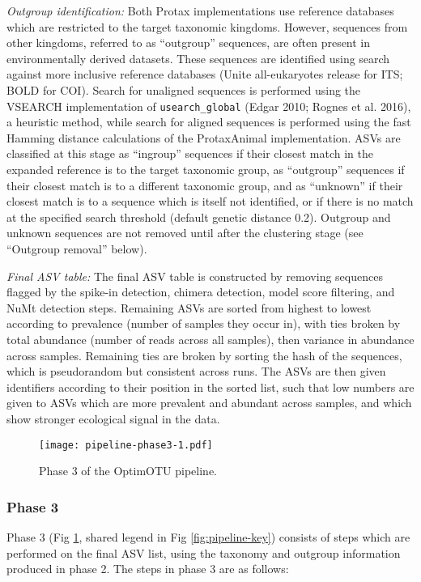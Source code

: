 \documentclass[
]{article}
\begin{document}
\emph{Outgroup identification:}
Both Protax implementations use reference databases which are restricted to the target taxonomic kingdoms.
However, sequences from other kingdoms, referred to as ``outgroup'' sequences, are often present in environmentally derived datasets.
These sequences are identified using search against more inclusive reference databases (Unite all-eukaryotes release for ITS; BOLD for COI).
Search for unaligned sequences is performed using the VSEARCH implementation of \texttt{usearch\_global} (Edgar 2010; Rognes et al. 2016), a heuristic method, while search for aligned sequences is performed using the fast Hamming distance calculations of the ProtaxAnimal implementation.
ASVs are classified at this stage as ``ingroup'' sequences if their closest match in the expanded reference is to the target taxonomic group, as ``outgroup'' sequences if their closest match is to a different taxonomic group, and as ``unknown'' if their closest match is to a sequence which is itself not identified, or if there is no match at the specified search threshold (default genetic distance 0.2).
Outgroup and unknown sequences are not removed until after the clustering stage (see ``Outgroup removal'' below).

\emph{Final ASV table:}
The final ASV table is constructed by removing sequences flagged by the spike-in detection, chimera detection, model score filtering, and NuMt detection steps.
Remaining ASVs are sorted from highest to lowest according to prevalence (number of samples they occur in), with ties broken by total abundance (number of reads across all samples), then variance in abundance across samples.
Remaining ties are broken by sorting the hash of the sequences, which is pseudorandom but consistent across runs.
The ASVs are then given identifiers according to their position in the sorted list, such that low numbers are given to ASVs which are more prevalent and abundant across samples, and which show stronger ecological signal in the data.

\begin{figure}
\centering
\texttt{[image: pipeline-phase3-1.pdf]}
\caption{\label{fig:pipeline-phase3}Phase 3 of the OptimOTU pipeline.}
\end{figure}

\subsubsection{Phase 3}\label{phase-3}

Phase 3 (Fig \ref{fig:pipeline-phase3}, shared legend in Fig \ref{fig:pipeline-key}) consists of steps which are performed on the final ASV list, using the taxonomy and outgroup information produced in phase 2.
The steps in phase 3 are as follows:
\end{document}

